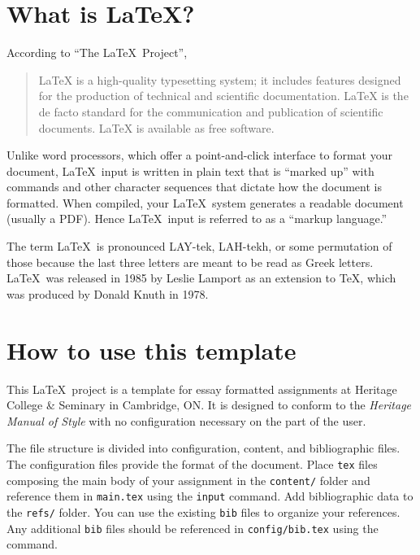 \section{What is \LaTeX?}

According to ``The \LaTeX\ Project'',

\begin{quote}
    LaTeX is a high-quality typesetting system; it includes features designed for the production of technical and scientific documentation. LaTeX is the de facto standard for the communication and publication of scientific documents. LaTeX is available as free software.\autocite{latexproject}
\end{quote}

Unlike word processors, which offer a point-and-click interface to format your document, \LaTeX\ input is written in plain text that is ``marked up'' with commands and other character sequences that dictate how the document is formatted. When compiled, your \LaTeX\ system generates a readable document (usually a PDF). Hence \LaTeX\ input is referred to as a ``markup language.''

The term \LaTeX\ is pronounced LAY-tek, LAH-tekh, or some permutation of those because the last three letters are meant to be read as Greek letters. \LaTeX\ was released in 1985 by Leslie Lamport as an extension to \TeX, which was produced by Donald Knuth in 1978.

\section{How to use this template}

This \LaTeX\ project is a template for essay formatted assignments at Heritage College \& Seminary in Cambridge, ON. It is designed to conform to the \emph{Heritage Manual of Style}\autocite{heritagestyle23} with no configuration necessary on the part of the user.

The file structure is divided into configuration, content, and bibliographic files. The configuration files provide the format of the document. Place \texttt{tex} files composing the main body of your assignment in the \texttt{content/} folder and reference them in \texttt{main.tex} using the \texttt{input} command. Add bibliographic data to the \texttt{refs/} folder. You can use the existing \texttt{bib} files to organize your references. Any additional \texttt{bib} files should be referenced in \texttt{config/bib.tex} using the  command.

